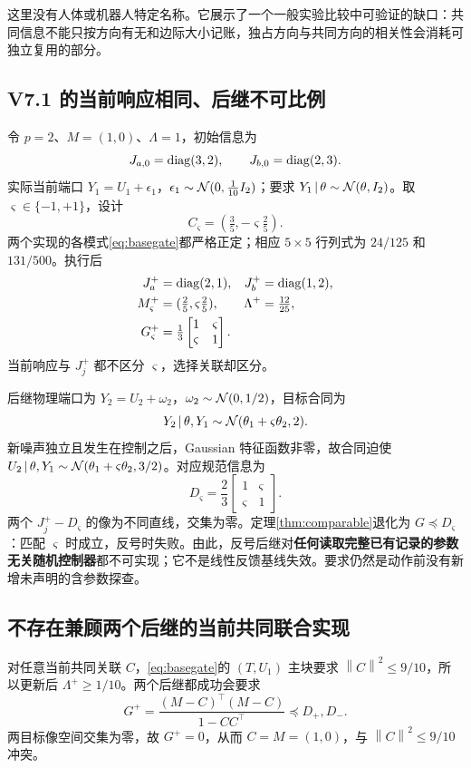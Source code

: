 \documentclass[UTF8,fontset=fandol,zihao=5,a4paper]{ctexart}
\newcommand{\norm}[1]{\left\lVert#1\right\rVert}
\theoremstyle{definition}
\theoremstyle{remark}\newtheorem{remark}[theorem]{说明}
\numberwithin{equation}{section}
\begin{document}
这里没有人体或机器人特定名称。它展示了一个一般实验比较中可验证的缺口：共同信息不能只按方向有无和边际大小记账，独占方向与共同方向的相关性会消耗可独立复用的部分。

\subsection{V7.1 的当前响应相同、后继不可比例}
令 $p=2$、$M=(1,0)$、$\Lambda=1$，初始信息为
\[
J_{a,0}=\operatorname{diag}(3,2),\qquad J_{b,0}=\operatorname{diag}(2,3).
\]
实际当前端口 $Y_1=U_1+\epsilon_1$，$\epsilon_1\sim\mathcal N(0,\tfrac1{10}I_2)$；要求 $Y_1\,|\,\theta\sim\mathcal N(\theta,I_2)$。取 $\varsigma\in\{-1,+1\}$，设计
\begin{equation}
C_\varsigma=(\tfrac35,-\varsigma\tfrac25).
\end{equation}
两个实现的各模式\eqref{eq:basegate}都严格正定；相应 $5\times5$ 行列式为 $24/125$ 和 $131/500$。执行后
\begin{align}
J_a^+&=\operatorname{diag}(2,1),&J_b^+&=\operatorname{diag}(1,2),\\
M_\varsigma^+&=(\tfrac25,\varsigma\tfrac25),&\Lambda^+&=\tfrac{12}{25},\\
G_\varsigma^+&=\tfrac13\begin{bmatrix}1&\varsigma\\\varsigma&1\end{bmatrix}.
\end{align}
当前响应与 $J_j^+$ 都不区分 $\varsigma$，选择关联却区分。

后继物理端口为 $Y_2=U_2+\omega_2$，$\omega_2\sim\mathcal N(0,1/2)$，目标合同为
\begin{equation}
Y_2\,|\,\theta,Y_1\sim\mathcal N(\theta_1+\varsigma\theta_2,2).
\label{eq:futures}
\end{equation}
新噪声独立且发生在控制之后，Gaussian 特征函数非零，故合同迫使
$U_2\,|\,\theta,Y_1\sim\mathcal N(\theta_1+\varsigma\theta_2,3/2)$。对应规范信息为
\begin{equation}
D_\varsigma=\frac23\begin{bmatrix}1&\varsigma\\\varsigma&1\end{bmatrix}.
\end{equation}
两个 $J_j^+-D_\varsigma$ 的像为不同直线，交集为零。定理\ref{thm:comparable}退化为 $G\preceq D_\varsigma$：匹配 $\varsigma$ 时成立，反号时失败。由此，反号后继对\textbf{任何读取完整已有记录的参数无关随机控制器}都不可实现；它不是线性反馈基线失效。要求仍然是动作前没有新增未声明的含参数探查。

\subsection{不存在兼顾两个后继的当前共同联合实现}
对任意当前共同关联 $C$，\eqref{eq:basegate}的 $(T,U_1)$ 主块要求 $\norm C^2\le9/10$，所以更新后 $\Lambda^+\ge1/10$。两个后继都成功会要求
\[
G^+=\frac{(M-C)^\top(M-C)}{1-CC^\top}\preceq D_+,D_-.
\]
两目标像空间交集为零，故 $G^+=0$，从而 $C=M=(1,0)$，与 $\norm C^2\le9/10$ 冲突。
\end{document}
